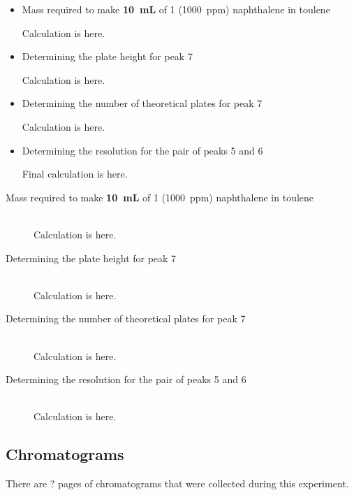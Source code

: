 \documentclass[a4paper, 12pt]{article}
\begin{document}
\begin{itemize}
	\item Mass required to make \textbf{\SI{10}{mL}} of \SI{1}{} (\SI{1000}{ppm}) naphthalene in toulene

	Calculation is here.

	\item Determining the plate height for peak 7

	Calculation is here.

	\item Determining the number of theoretical plates for peak 7

	Calculation is here.

	\item Determining the resolution for the pair of peaks 5 and 6

	Final calculation is here.
\end{itemize}

\begin{description}
	\item[Mass required to make \textbf{\SI{10}{mL}} of \SI{1}{} (\SI{1000}{ppm}) naphthalene in toulene] \hfill \\
	Calculation is here.
	\item[Determining the plate height for peak 7] \hfill \\
	Calculation is here.
	\item[Determining the number of theoretical plates for peak 7] \hfill \\
	Calculation is here.
	\item[Determining the resolution for the pair of peaks 5 and 6] \hfill \\
	Calculation is here.
\end{description}


\subsection{Chromatograms}
There are ? pages of chromatograms that were collected during this experiment.


\end{document}
